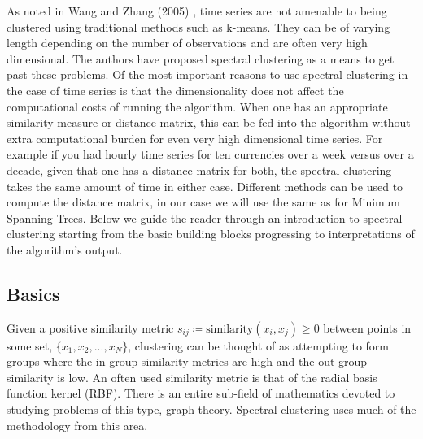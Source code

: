 \documentclass[a4paper]{article}
\begin{document}
\begin{multicols}{2}
As noted in Wang and Zhang (2005) \cite{spectraltime}, time series are not amenable to being clustered using traditional methods such as k-means. They can be of varying length depending on the number of observations and are often very high dimensional. The authors have proposed spectral clustering as a means to get past these problems. Of the most important reasons to use spectral clustering in the case of time series is that the dimensionality does not affect the computational costs of running the algorithm. When one has an appropriate similarity measure or distance matrix, this can be fed into the algorithm without extra computational burden for even very high dimensional time series. For example if you had hourly time series for ten currencies over a week versus over a decade, given that one has a distance matrix for both, the spectral clustering takes the same amount of time in either case. Different methods can be used to compute the distance matrix, in our case we will use the same as for Minimum Spanning Trees. Below we guide the reader through an introduction to spectral clustering starting from the basic building blocks progressing to interpretations of the algorithm's output.

\subsection{Basics}
Given a positive similarity metric $s_{ij} \coloneqq \text{similarity}(x_i, x_j) \geq 0$  between points in some set, $\{x_1,x_2,..., x_N \}$, clustering can be thought of as attempting to form groups where the in-group similarity metrics are high and the out-group similarity is low. An often used similarity metric is that of the radial basis function kernel (RBF). There is an entire sub-field of mathematics devoted to studying problems of this type, graph theory. Spectral clustering uses much of the methodology from this area. 


\end{multicols}
\end{document}
